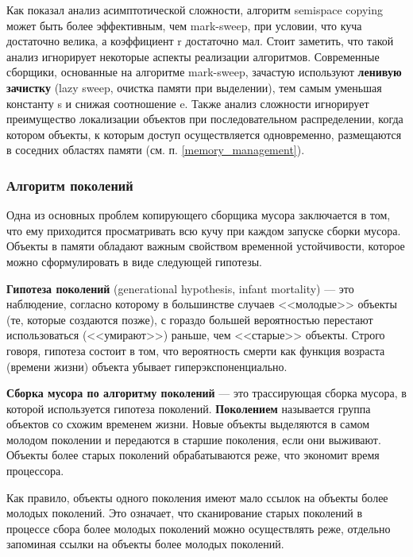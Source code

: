 Как показал анализ асимптотической сложности, алгоритм semispace copying может быть более эффективным, чем mark-sweep, при условии, что куча достаточно велика, а коэффициент r достаточно мал. Стоит заметить, что такой анализ игнорирует некоторые аспекты реализации алгоритмов. Современные сборщики, основанные на алгоритме mark-sweep, зачастую используют \textbf{ленивую зачистку} (lazy sweep, очистка памяти при выделении), тем самым уменьшая константу s и снижая соотношение e. Также анализ сложности игнорирует преимущество локализации объектов при последовательном распределении, когда котором объекты, к которым доступ осуществляется одновременно, размещаются в соседних областях памяти (см. п. \ref{memory_management}).



\subsubsection{Алгоритм поколений}
\label{generational}

Одна из основных проблем копирующего сборщика мусора заключается в том, что ему приходится просматривать всю кучу при каждом запуске сборки мусора. Объекты в памяти обладают важным свойством временной устойчивости, которое можно сформулировать в виде следующей гипотезы. \cite{cornell3}

\textbf{Гипотеза поколений} (generational hypothesis, infant mortality) \cite{glossary} --- это наблюдение, согласно которому в большинстве случаев <<молодые>> объекты (те, которые создаются позже), с гораздо большей вероятностью перестают использоваться (<<умирают>>) раньше, чем <<старые>> объекты. Строго говоря, гипотеза состоит в том, что вероятность смерти как функция возраста (времени жизни) объекта убывает гиперэкспоненциально.

\textbf{Сборка мусора по алгоритму поколений} \cite{glossary} --- это трассирующая сборка мусора, в которой используется гипотеза поколений. \textbf{Поколением} называется группа объектов со схожим временем жизни. Новые объекты выделяются в самом молодом поколении и передаются в старшие поколения, если они выживают. Объекты более старых поколений обрабатываются реже, что экономит время процессора.

Как правило, объекты одного поколения имеют мало ссылок на объекты более молодых поколений. Это означает, что сканирование старых поколений в процессе сбора более молодых поколений можно осуществлять реже, отдельно запоминая ссылки на объекты более молодых поколений. \cite{cornell3}

